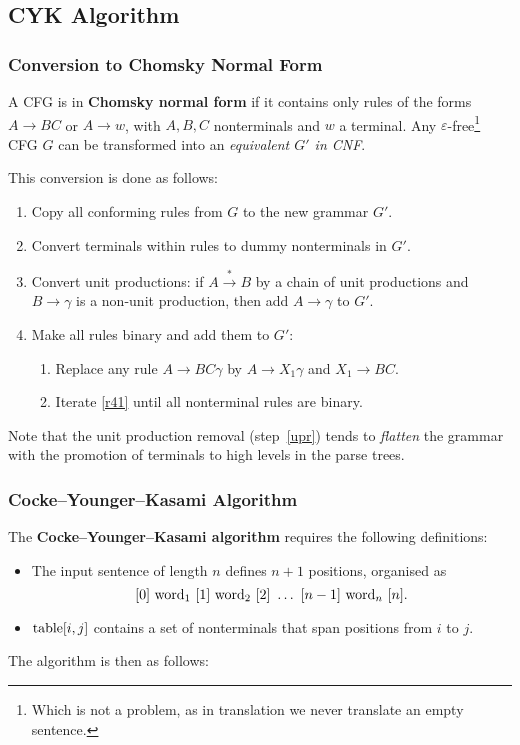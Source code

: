 \subsection{CYK Algorithm}
\subsubsection{Conversion to Chomsky Normal Form}
A CFG is in \textbf{Chomsky normal form} if it contains only rules of the forms \(A \to B C\) or \(A \to w\), with \(A, B, C\) nonterminals and \(w\) a terminal.
Any \(\varepsilon\)-free\footnote{Which is not a problem, as in translation we never translate an empty sentence.} CFG \(G\) can be transformed into an \emph{equivalent \(G'\) in CNF}.

This conversion is done as follows:
\begin{enumerate}
	\item Copy all conforming rules from \(G\) to the new grammar \(G'\).
	\item Convert terminals within rules to dummy nonterminals in \(G'\).
	\item \label{upr}Convert unit productions: if \(A \overset{*}{\to} B\) by a chain of unit productions and \(B \to \gamma\) is a non-unit production, then add \(A \to \gamma\) to \(G'\).
	\item Make all rules binary and add them to \(G'\):
	\begin{enumerate}
		\item \label{r41}Replace any rule \(A \to BC\gamma\) by \(A \to X_1 \gamma\) and \(X_1 \to BC\).
		\item Iterate \ref{r41} until all nonterminal rules are binary.
	\end{enumerate}
\end{enumerate}
Note that the unit production removal (step~\ref{upr}) tends to \emph{flatten} the grammar with the promotion of terminals to high levels in the parse trees.

\subsubsection{Cocke--Younger--Kasami Algorithm}
The \textbf{Cocke--Younger--Kasami algorithm} requires the following definitions:
\begin{itemize}
	\item The input sentence of length \(n\) defines \(n+1\) positions, organised as
	\[
	[0]\ \textnormal{word}_1\ [1]\ \textnormal{word}_2\ [2]\ \dots\ [n-1]\ \textnormal{word}_n\ [n].
	\]
	\item \(\textnormal{table}[i, j]\) contains a set of nonterminals that span positions from \(i\) to \(j\).
\end{itemize}
The algorithm is then as follows:

